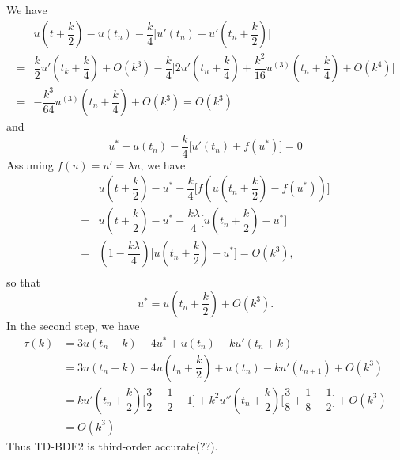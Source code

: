 \documentclass[11pt]{article}
\begin{document}
\subsection{}
We have
\begin{equation}\begin{split}
    &u(t+\dfrac k2)-u(t_n)-\dfrac k4\big[u'(t_n)+u'(t_n+\dfrac k2)\big]\\
    =&\dfrac k2u'(t_k+\dfrac k4)+O(k^3)-\dfrac k4\big[2u'(t_n+\dfrac k4)+\dfrac{k^2}{16}u^{(3)}(t_n+\dfrac k4)+O(k^4)\big]\\
    =&-\dfrac{k^3}{64}u^{(3)}(t_n+\dfrac k4) + O(k^3) = O(k^3)
\end{split}\end{equation} 
and
\begin{equation}
    u^*-u(t_n)-\dfrac k4\big[u'(t_n)+f(u^*)\big] = 0
\end{equation}
Assuming $f(u)=u'=\lambda u$, we have
\begin{equation}\begin{split}
    &u(t+\dfrac k2) - u^* -\dfrac k4\big[f(u(t_n+\dfrac k2)-f(u^*))\big]\\
    =&u(t+\dfrac k2)-u^*-\dfrac{k\lambda}4\big[u(t_n+\dfrac k2)-u^*\big]\\
    =&(1-\dfrac{k\lambda}4)\big[u(t_n+\dfrac k2)-u^*\big]=O(k^3),\\
\end{split}\nonumber\end{equation}
so that
\begin{equation}
    u^* = u(t_n+\dfrac k2) + O(k^3).
\end{equation} 
In the second step, we have 
\begin{equation}\begin{split}
    \tau(k) &= 3u(t_n+k)-4u^*+u(t_n)-ku'(t_n+k)\\
            &= 3u(t_n+k)-4u(t_n+\dfrac k2)+u(t_n)-ku'(t_{n+1}) + O(k^3)\\
            &=ku'(t_n+\dfrac k2)\big[\dfrac32-\dfrac12-1\big] +
                k^2u''(t_n+\dfrac k2)\big[\dfrac38+\dfrac18-\dfrac12\big]+O(k^3)\\
            &=O(k^3)
\end{split}\end{equation} 
Thus TD-BDF2 is third-order accurate(??).
\subsection{}


\pagebreak
\section{}
\end{document}

